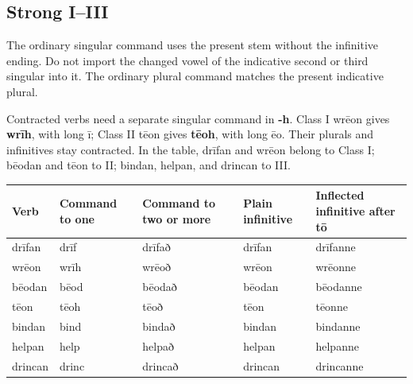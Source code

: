 \subsection*{Strong I–III}

The ordinary singular command uses the present stem without the infinitive ending. Do not import the changed vowel of the indicative second or third singular into it. The ordinary plural command matches the present indicative plural.

Contracted verbs need a separate singular command in \textbf{-h}. Class I wrēon gives \textbf{wrīh}, with long ī; Class II tēon gives \textbf{tēoh}, with long ēo. Their plurals and infinitives stay contracted. In the table, drīfan and wrēon belong to Class I; bēodan and tēon to II; bindan, helpan, and drincan to III.

\par\begingroup
\fontsize{10.5}{13.2}\selectfont
\setlength{\LTleft}{0pt}\setlength{\LTright}{\fill}
\noindent
\begin{tabular}{@{}>{\raggedright\arraybackslash}p{17.31mm}>{\raggedright\arraybackslash}p{17.57mm}>{\raggedright\arraybackslash}p{23.8mm}>{\raggedright\arraybackslash}p{21.98mm}>{\raggedright\arraybackslash}p{32.1mm}@{}}
\toprule
\textbf{Verb} & \textbf{Command to one} & \textbf{Command to two or more} & \textbf{Plain infinitive} & \textbf{Inflected infinitive after tō} \\
\midrule
drīfan & drīf & drīfað & drīfan & drīfanne \\
wrēon & wrīh & wrēoð & wrēon & wrēonne \\
bēodan & bēod & bēodað & bēodan & bēodanne \\
tēon & tēoh & tēoð & tēon & tēonne \\
bindan & bind & bindað & bindan & bindanne \\
helpan & help & helpað & helpan & helpanne \\
drincan & drinc & drincað & drincan & drincanne \\
\bottomrule
\end{tabular}
\par\endgroup


